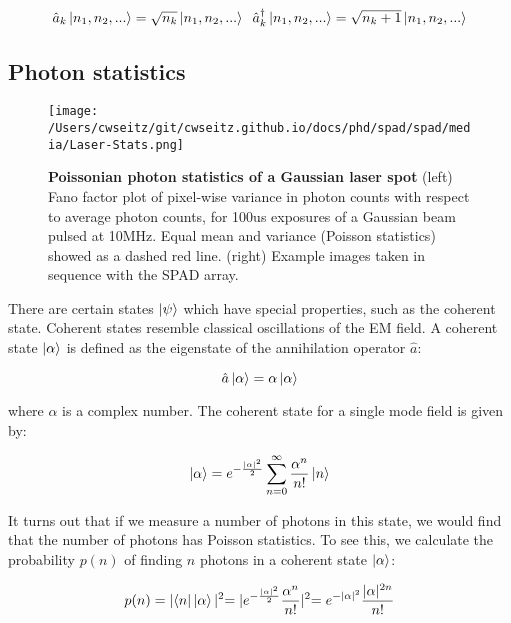 \begin{equation*}
\hat{a}_k \ket{n_1, n_2, ...} = \sqrt{n_k} \ket{n_1, n_2, ...} \;\;
\hat{a}_k^\dagger \ket{n_1, n_2, ...} = \sqrt{n_k + 1} \ket{n_1, n_2, ...}
\end{equation*}

\subsection{Photon statistics}

\begin{figure*}[t]
\centering
\texttt{[image: /Users/cwseitz/git/cwseitz.github.io/docs/phd/spad/spad/media/Laser-Stats.png]}
\caption{\textbf{Poissonian photon statistics of a Gaussian laser spot} (left) Fano factor plot of pixel-wise variance in photon counts with respect to average photon counts, for 100us exposures of a Gaussian beam pulsed at 10MHz. Equal mean and variance (Poisson statistics) showed as a dashed red line. (right) Example images taken in sequence with the SPAD array.}
\label{fig:fig29}
\end{figure*}    

There are certain states $\ket{\psi}$ which have special properties, such as the coherent state. Coherent states resemble classical oscillations of the EM field. A coherent state $\ket{\alpha}$ is defined as the eigenstate of the annihilation operator $\hat{a}$:

\begin{equation*}
\hat{a} \ket{\alpha} = \alpha \ket{\alpha}
\end{equation*}

where $\alpha$ is a complex number. The coherent state for a single mode field is given by:

\begin{equation*}
\ket{\alpha} = e^{-\frac{\lvert\alpha\lvert^2}{2}} \sum_{n=0}^\infty \frac{\alpha^n}{n!} \ket{n}
\end{equation*}

It turns out that if we measure a number of photons in this state, we would find that the number of photons has Poisson statistics. To see this, we calculate the probability $p(n)$ of finding $n$ photons in a coherent state $\ket{\alpha}$:

\begin{equation*}
p(n) = \lvert \bra{n} \ket{\alpha} \lvert^2 = \lvert e^{-\frac{\lvert\alpha\lvert^2}{2}} \frac{\alpha^n}{n!} \lvert^2 = e^{-\lvert\alpha\lvert^2} \frac{\lvert\alpha\lvert^{2n}}{n!}
\end{equation*}

